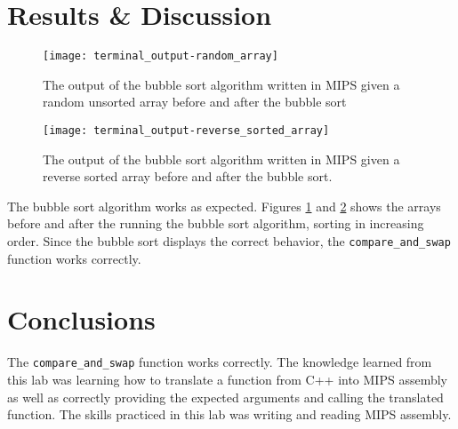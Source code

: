 \documentclass[11pt]{report}
\begin{document}
\section*{Results \& Discussion}
\begin{figure}[h!]
    \centering
    \texttt{[image: terminal\_output-random\_array]}
    \caption{
        The output of the bubble sort algorithm written in MIPS given a random unsorted array before
        and after the bubble sort
    }
    \label{fig:out-rand_array}
\end{figure}

\begin{figure}[h!]
    \centering
    \texttt{[image: terminal\_output-reverse\_sorted\_array]}
    \caption{
        The output of the bubble sort algorithm written in MIPS given a reverse sorted array before
        and after the bubble sort.
    }
    \label{fig:out-rev_array}
\end{figure}
The bubble sort algorithm works as expected. Figures \ref{fig:out-rand_array} and
\ref{fig:out-rev_array} shows the arrays before and after the running the bubble sort algorithm,
sorting in increasing order. Since the bubble sort displays the correct behavior, the
\verb|compare_and_swap| function works correctly.

\section*{Conclusions}
The \verb|compare_and_swap| function works correctly. The knowledge learned from this lab was
learning how to translate a function from C++ into MIPS assembly as well as correctly providing the
expected arguments and calling the translated function. The skills practiced in this lab was writing
and reading MIPS assembly.


% 
% 
% 
% 
% 
% 
\end{document}
